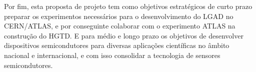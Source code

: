 
Por fim, esta proposta de projeto tem como objetivos estratégicos de curto prazo preparar os experimentos necessários para o desenvolvimento do LGAD no CERN/ATLAS, e por conseguinte colaborar com o experimento ATLAS na construção do HGTD. E para médio e longo prazo os objetivos de desenvolver dispositivos semicondutores para diversas aplicações científicas no âmbito nacional e internacional, e com isso consolidar a tecnologia de sensores semicondutores.















